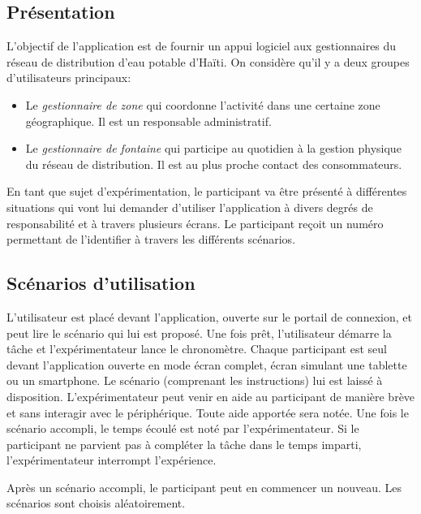\documentclass[a4paper, 11pt]{article}
\begin{document}
    \subsection*{Présentation}
        L'objectif de l'application est de fournir un appui logiciel aux gestionnaires du réseau de distribution d'eau potable d'Haïti. On considère qu'il y a deux groupes d'utilisateurs principaux:
        \begin{itemize}
            \item Le \emph{gestionnaire de zone} qui coordonne l'activité dans une certaine zone géographique. Il est un responsable administratif.
            \item Le \emph{gestionnaire de fontaine} qui participe au quotidien à la gestion physique du réseau de distribution. Il est au plus proche contact des consommateurs.
        \end{itemize}
        En tant que sujet d'expérimentation, le participant va être présenté à différentes situations qui vont lui demander d'utiliser l'application à divers degrés de responsabilité et à travers plusieurs écrans. Le participant reçoit un numéro permettant de l'identifier à travers les différents scénarios.

    \subsection*{Scénarios d'utilisation}
        L'utilisateur est placé devant l'application, ouverte sur le portail de connexion, et peut lire le scénario qui lui est proposé. Une fois prêt, l'utilisateur démarre la tâche et l'expérimentateur lance le chronomètre. Chaque participant est seul devant l'application ouverte en mode écran complet, écran simulant une tablette ou un smartphone. Le scénario (comprenant les instructions) lui est laissé à disposition. L'expérimentateur peut venir en aide au participant de manière brève et sans interagir avec le périphérique. Toute aide apportée sera notée. Une fois le scénario accompli, le temps écoulé est noté par l'expérimentateur. Si le participant ne parvient pas à compléter la tâche dans le temps imparti, l'expérimentateur interrompt l'expérience.

        Après un scénario accompli, le participant peut en commencer un nouveau. Les scénarios sont choisis aléatoirement.
\end{document}
